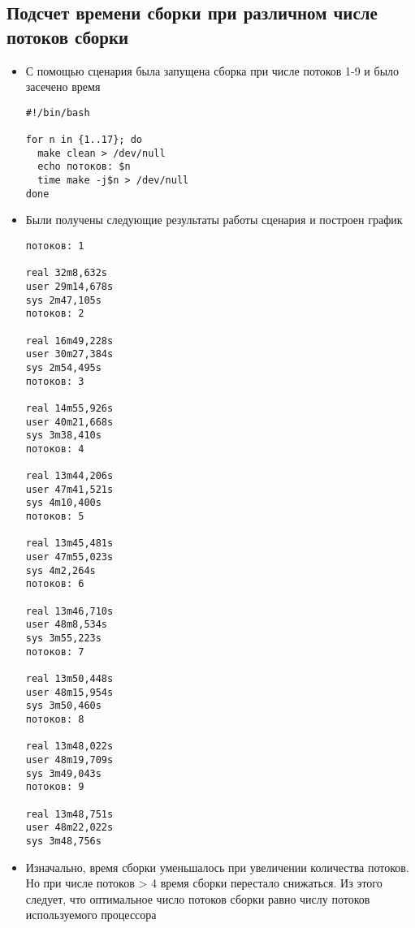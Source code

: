\documentclass[a4paper]{article}
\begin{document}
    \subsection{Подсчет времени сборки при различном числе потоков сборки}
    \begin{itemize}
        \item С помощью сценария была запущена сборка при числе потоков
        1-9 и было засечено время
        \begin{verbatim}
#!/bin/bash

for n in {1..17}; do
  make clean > /dev/null
  echo потоков: $n
  time make -j$n > /dev/null
done
        \end{verbatim}
        \item Были получены следующие результаты работы сценария и построен график
        \begin{verbatim}
потоков: 1

real 32m8,632s
user 29m14,678s
sys 2m47,105s
потоков: 2

real 16m49,228s
user 30m27,384s
sys 2m54,495s
потоков: 3

real 14m55,926s
user 40m21,668s
sys 3m38,410s
потоков: 4

real 13m44,206s
user 47m41,521s
sys 4m10,400s
потоков: 5

real 13m45,481s
user 47m55,023s
sys 4m2,264s
потоков: 6

real 13m46,710s
user 48m8,534s
sys 3m55,223s
потоков: 7

real 13m50,448s
user 48m15,954s
sys 3m50,460s
потоков: 8

real 13m48,022s
user 48m19,709s
sys 3m49,043s
потоков: 9

real 13m48,751s
user 48m22,022s
sys 3m48,756s
        \end{verbatim}

        \item Изначально, время сборки уменьшалось при увеличении количества потоков.
        Но при числе потоков > 4 время сборки перестало снижаться. Из этого следует, что оптимальное
        число потоков сборки равно числу потоков используемого процессора
    \end{itemize}
\end{document}
